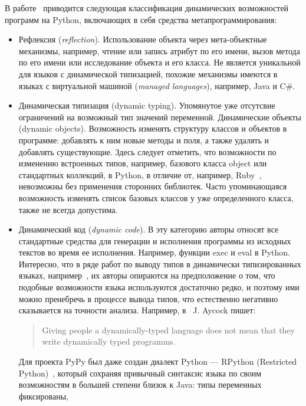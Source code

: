 В работе~\cite[]{Holkner2009} приводится следующая классификация динамических возможностей
программ на Python, включающих в себя средства метапрограммирования: 

\begin{itemize}
  \item{Рефлексия (\emph{reflection}). 
      Использование объекта через мета-объектные механизмы, например,
      чтение или запись атрибут по его имени, вызов метода по его имени или
      исследование объекта и его класса. Не является уникальной для языков с
      динамической типизацией, похожие механизмы имеются в языках с виртуальной
      машиной (\emph{managed languages}), например, Java и C\#.}
  \item{Динамическая типизация (dynamic typing). 
      Упомянутое уже отсутсвие
      ограничений на возможный тип значений переменной.  Динамические объекты
      (dynamic objects). Возможность изменять структуру классов и объектов в
      программе: добавлять к ним новые методы и поля, а также удалять и добавлять
      существующие. Здесь следует отметить, что возможности по изменению встроенных
      типов, например, базового класса object или стандартных коллекций, в Python, в
      отличие от, например, Ruby~\cite{Madsen2007}, невозможны без применения сторонних библиотек.
      Часто упоминающаяся возможность изменять список базовых классов у уже
      определенного класса, также не всегда допустима.}
  \item{  
      Динамический код (\emph{dynamic code}).
      В эту категорию авторы относят все стандартные средства для
      генерации и исполнения программы из исходных текстов во время ее
      исполнения.  Например, функции exec и eval в Python.  Интересно, что в ряде
      работ по выводу типов в динамически типизированных языках,
      например~\cite{Salib2004,Aycock2000},  их авторы опираются на предположение о
      том, что подобные возможности языка используются достаточно редко, и поэтому
      ими можно пренебречь в процессе вывода типов, что естественно негативно
      сказывается на точности анализа. Например, в~\cite{Aycock2000} J. Aycock пишет:
      \begin{quote}
        Giving people a dynamically-typed language does not mean that they write
        dynamically typed programms.
      \end{quote}
      Для проекта PyPy был даже создан диалект Python --- RPython (Restricted
      Python)~\cite{Ancona2007}, который сохраняя привычный синтаксис языка по своим
      возможностям в большей степени близок к Java: типы переменных фиксированы,
}
\end{itemize}
